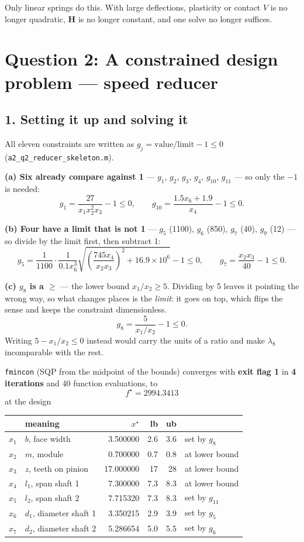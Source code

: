 \documentclass[11pt,a4paper]{article}
\begin{document}
Only linear springs do this. With large deflections, plasticity or contact $V$
is no longer quadratic, $\bm{H}$ is no longer constant, and one solve no longer
suffices.

\newpage
\section*{Question 2: A constrained design problem --- speed reducer}

\subsection*{1. Setting it up and solving it}

All eleven constraints are written as
$g_j = \text{value}/\text{limit} - 1 \le 0$
(\texttt{a2\_q2\_reducer\_skeleton.m}).

\textbf{(a) Six already compare against 1} --- $g_1$, $g_2$, $g_3$, $g_4$,
$g_{10}$, $g_{11}$ --- so only the $-1$ is needed:
\[
  g_1 = \frac{27}{x_1x_2^2x_3} - 1 \le 0,
  \qquad
  g_{10} = \frac{1.5x_6 + 1.9}{x_4} - 1 \le 0 .
\]

\textbf{(b) Four have a limit that is not 1} --- $g_5$ (1100), $g_6$ (850),
$g_7$ (40), $g_9$ (12) --- so divide by the limit first, then subtract 1:
\[
  g_5 = \frac{1}{1100}\cdot\frac{1}{0.1x_6^3}
        \sqrt{\left(\frac{745x_4}{x_2x_3}\right)^{\!2} + 16.9\times10^6} - 1 \le 0,
  \qquad
  g_7 = \frac{x_2x_3}{40} - 1 \le 0 .
\]

\textbf{(c) $g_8$ is a $\ge$} --- the lower bound $x_1/x_2 \ge 5$. Dividing by 5
leaves it pointing the wrong way, so what changes places is the \emph{limit}: it
goes on top, which flips the sense and keeps the constraint dimensionless.
\[
  g_8 = \frac{5}{x_1/x_2} - 1 \le 0 .
\]
Writing $5 - x_1/x_2 \le 0$ instead would carry the units of a ratio and make
$\lambda_8$ incomparable with the rest.

\texttt{fmincon} (SQP from the midpoint of the bounds) converges with
\textbf{exit flag 1} in \textbf{4 iterations} and 40 function evaluations, to
\[
  f^\star = 2994.3413
\]
at the design

\begin{center}
\begin{tabular}{llrrrl}
\toprule
 & meaning & $x^\star$ & lb & ub & \\
\midrule
$x_1$ & $b$, face width        & 3.500000 & 2.6 & 3.6 & set by $g_8$ \\
$x_2$ & $m$, module            & 0.700000 & 0.7 & 0.8 & at lower bound \\
$x_3$ & $z$, teeth on pinion   & 17.000000 & 17 & 28 & at lower bound \\
$x_4$ & $l_1$, span shaft 1    & 7.300000 & 7.3 & 8.3 & at lower bound \\
$x_5$ & $l_2$, span shaft 2    & 7.715320 & 7.3 & 8.3 & set by $g_{11}$ \\
$x_6$ & $d_1$, diameter shaft 1 & 3.350215 & 2.9 & 3.9 & set by $g_5$ \\
$x_7$ & $d_2$, diameter shaft 2 & 5.286654 & 5.0 & 5.5 & set by $g_6$ \\
\bottomrule
\end{tabular}
\end{center}
\end{document}
